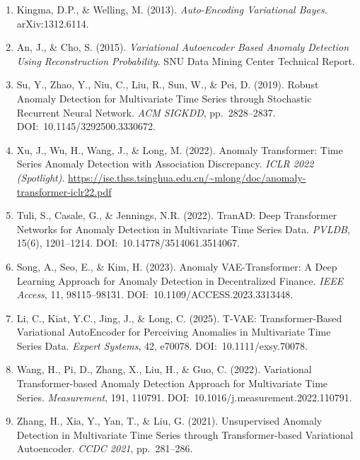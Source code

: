 \documentclass[12pt,a4paper]{article}
\begin{document}
\begin{enumerate}

\item[\lbrack F1\rbrack] Kingma, D.P., \& Welling, M. (2013).
\textit{Auto-Encoding Variational Bayes}. arXiv:1312.6114.

\item[\lbrack F2\rbrack] An, J., \& Cho, S. (2015).
\textit{Variational Autoencoder Based Anomaly Detection Using Reconstruction
Probability}. SNU Data Mining Center Technical Report.

\item[\lbrack F3\rbrack] Su, Y., Zhao, Y., Niu, C., Liu, R., Sun, W., \&
Pei, D. (2019). Robust Anomaly Detection for Multivariate Time Series through
Stochastic Recurrent Neural Network. \textit{ACM SIGKDD}, pp.~2828--2837.
DOI:~10.1145/3292500.3330672.

\item[\lbrack T1\rbrack] Xu, J., Wu, H., Wang, J., \& Long, M. (2022).
Anomaly Transformer: Time Series Anomaly Detection with Association Discrepancy.
\textit{ICLR 2022 (Spotlight)}.
\url{https://ise.thss.tsinghua.edu.cn/~mlong/doc/anomaly-transformer-iclr22.pdf}

\item[\lbrack T2\rbrack] Tuli, S., Casale, G., \& Jennings, N.R. (2022).
TranAD: Deep Transformer Networks for Anomaly Detection in Multivariate Time
Series Data. \textit{PVLDB}, 15(6), 1201--1214. DOI:~10.14778/3514061.3514067.

\item[\lbrack H1\rbrack] Song, A., Seo, E., \& Kim, H. (2023). Anomaly
VAE-Transformer: A Deep Learning Approach for Anomaly Detection in
Decentralized Finance. \textit{IEEE Access}, 11, 98115--98131.
DOI:~10.1109/ACCESS.2023.3313448.

\item[\lbrack H2\rbrack] Li, C., Kiat, Y.C., Jing, J., \& Long, C. (2025).
T-VAE: Transformer-Based Variational AutoEncoder for Perceiving Anomalies in
Multivariate Time Series Data. \textit{Expert Systems}, 42, e70078.
DOI:~10.1111/exsy.70078.

\item[\lbrack H3\rbrack] Wang, H., Pi, D., Zhang, X., Liu, H., \& Guo, C.
(2022). Variational Transformer-based Anomaly Detection Approach for
Multivariate Time Series. \textit{Measurement}, 191, 110791.
DOI:~10.1016/j.measurement.2022.110791.

\item[\lbrack H4\rbrack] Zhang, H., Xia, Y., Yan, T., \& Liu, G. (2021).
Unsupervised Anomaly Detection in Multivariate Time Series through
Transformer-based Variational Autoencoder. \textit{CCDC 2021}, pp.~281--286.


\end{enumerate}
\end{document}
